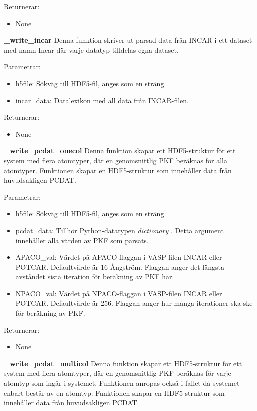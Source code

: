 Returnerar: 
\begin{itemize}
    \item None 
\end{itemize}

\textbf{\_write\_incar}
\newline 
Denna funktion skriver ut parsad data från INCAR i ett dataset med namn Incar där varje datatyp tilldelas egna dataset.

Parametrar:
\begin{itemize}
    \setlength\itemsep{0em}
    \item h5file: Sökväg till HDF5-fil, anges som en sträng. 
    \item incar\_data: Datalexikon med all data från INCAR-filen.
\end{itemize}

Returnerar: 
\begin{itemize}
    \item None 
\end{itemize}

\textbf{\_write\_pcdat\_onecol}
\newline 
Denna funktion skapar ett HDF5-struktur för ett system med flera atomtyper, där en genomsnittlig PKF beräknas för alla atomtyper. Funktionen skapar en HDF5-struktur som innehåller data från huvudsakligen PCDAT. 

Parametrar:
\begin{itemize}
    \setlength\itemsep{0em}
    \item h5file: Sökväg till HDF5-fil, anges som en sträng. 
    \item pcdat\_data: Tillhör Python-datatypen \textit{dictionary} \cite{dict}. Detta argument innehåller alla värden av PKF som parsats.  
    \item APACO\_val: Värdet på APACO-flaggan i VASP-filen INCAR eller POTCAR. Defaultvärde är 16 Ångström. Flaggan anger det längsta avståndet sista iteration för beräkning av PKF har.     
    \item NPACO\_val: Värdet på NPACO-flaggan i VASP-filen INCAR eller POTCAR. Defaultvärde är 256. Flaggan anger hur många iterationer ska ske för beräkning av PKF.      
\end{itemize}

Returnerar: 
\begin{itemize}
    \item None 
\end{itemize}

\textbf{\_write\_pcdat\_multicol}
\newline 
Denna funktion skapar ett HDF5-struktur för ett system med flera atomtyper, där en genomsnittlig PKF beräknas för varje atomtyp som ingår i systemet. Funktionen anropas också i fallet då systemet enbart består av en atomtyp. Funktionen skapar en HDF5-struktur som innehåller data från huvudsakligen PCDAT. 

